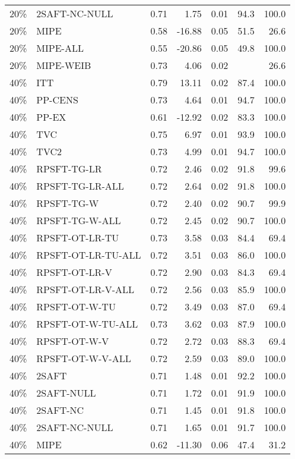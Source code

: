 \begin{table}[ht]
{\begin{tabular}{llrrrrr}
  20\% & 2SAFT-NC-NULL & 0.71 & 1.75 & 0.01 & 94.3 & 100.0 \\ 
  20\% & MIPE & 0.58 & -16.88 & 0.05 & 51.5 & 26.6 \\ 
  20\% & MIPE-ALL & 0.55 & -20.86 & 0.05 & 49.8 & 100.0 \\ 
  20\% & MIPE-WEIB & 0.73 & 4.06 & 0.02 &  & 26.6 \\ 
   \hline
40\% & ITT & 0.79 & 13.11 & 0.02 & 87.4 & 100.0 \\ 
  40\% & PP-CENS & 0.73 & 4.64 & 0.01 & 94.7 & 100.0 \\ 
  40\% & PP-EX & 0.61 & -12.92 & 0.02 & 83.3 & 100.0 \\ 
  40\% & TVC & 0.75 & 6.97 & 0.01 & 93.9 & 100.0 \\ 
  40\% & TVC2 & 0.73 & 4.99 & 0.01 & 94.7 & 100.0 \\ 
   \hline
40\% & RPSFT-TG-LR & 0.72 & 2.46 & 0.02 & 91.8 & 99.6 \\ 
  40\% & RPSFT-TG-LR-ALL & 0.72 & 2.64 & 0.02 & 91.8 & 100.0 \\ 
  40\% & RPSFT-TG-W & 0.72 & 2.40 & 0.02 & 90.7 & 99.9 \\ 
  40\% & RPSFT-TG-W-ALL & 0.72 & 2.45 & 0.02 & 90.7 & 100.0 \\ 
  40\% & RPSFT-OT-LR-TU & 0.73 & 3.58 & 0.03 & 84.4 & 69.4 \\ 
  40\% & RPSFT-OT-LR-TU-ALL & 0.72 & 3.51 & 0.03 & 86.0 & 100.0 \\ 
  40\% & RPSFT-OT-LR-V & 0.72 & 2.90 & 0.03 & 84.3 & 69.4 \\ 
  40\% & RPSFT-OT-LR-V-ALL & 0.72 & 2.56 & 0.03 & 85.9 & 100.0 \\ 
   \hline
40\% & RPSFT-OT-W-TU & 0.72 & 3.49 & 0.03 & 87.0 & 69.4 \\ 
  40\% & RPSFT-OT-W-TU-ALL & 0.73 & 3.62 & 0.03 & 87.9 & 100.0 \\ 
  40\% & RPSFT-OT-W-V & 0.72 & 2.72 & 0.03 & 88.3 & 69.4 \\ 
  40\% & RPSFT-OT-W-V-ALL & 0.72 & 2.59 & 0.03 & 89.0 & 100.0 \\ 
   \hline
40\% & 2SAFT & 0.71 & 1.48 & 0.01 & 92.2 & 100.0 \\ 
  40\% & 2SAFT-NULL & 0.71 & 1.72 & 0.01 & 91.9 & 100.0 \\ 
  40\% & 2SAFT-NC & 0.71 & 1.45 & 0.01 & 91.8 & 100.0 \\ 
  40\% & 2SAFT-NC-NULL & 0.71 & 1.65 & 0.01 & 91.7 & 100.0 \\ 
  40\% & MIPE & 0.62 & -11.30 & 0.06 & 47.4 & 31.2 \\ 

\end{tabular}}
\end{table}
